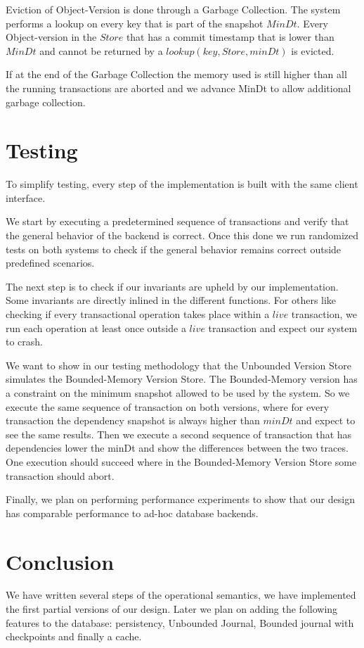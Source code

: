 \documentclass[systeme,french,english]{compas2022}
\begin{document}
Eviction of Object-Version is done through a Garbage Collection.
The system performs a lookup on every key that is part of the snapshot $\mathit{MinDt}$.
Every Object-version in the $\mathit{Store}$ that has a commit timestamp that is lower than $\mathit{MinDt}$ and cannot be returned by a $\mathit{lookup(key,Store,minDt)}$ is evicted.

If at the end of the Garbage Collection the memory used is still higher than all the running transactions are aborted and we advance MinDt to allow additional garbage collection.


\section{Testing}

To simplify testing, every step of the implementation is built with the same client interface. 

We start by executing a predetermined sequence of transactions and verify that the general behavior of the backend is correct.
Once this done we run randomized tests on both systems to check if the general behavior remains correct outside predefined scenarios.

The next step is to check if our invariants are upheld by our implementation.
Some invariants are directly inlined in the different functions.
For others like checking if every transactional operation takes place within a $\mathit{live}$ transaction, we run each operation at least once outside a $\mathit{live}$ transaction and expect our system to crash.

We want to show in our testing methodology that the Unbounded Version Store simulates the Bounded-Memory Version Store.
The Bounded-Memory version has a constraint on the minimum snapshot allowed to be used by the system.
So we execute the same sequence of transaction on both versions, where for every transaction the dependency snapshot is always higher than $\mathit{minDt}$ and expect to see the same results.
Then we execute a second sequence of transaction that has dependencies lower the minDt and show the differences between the two traces.
One execution should succeed where in the Bounded-Memory Version Store some transaction should abort.

Finally, we plan on performing performance experiments to show that our design has comparable performance to ad-hoc database backends.

\section{Conclusion}
We have written several steps of the operational semantics, we have implemented the first partial versions of our design.
Later we plan on adding the following features to the database: persistency, Unbounded Journal, Bounded journal with checkpoints and finally a cache.
\end{document}
